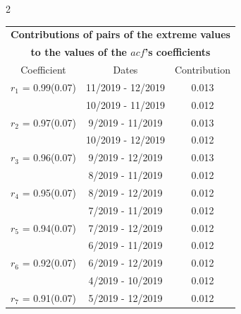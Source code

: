 
\thispagestyle{empty}
\begin{multicols}{2}{ 
\begin{tabular}{ccc}
\multicolumn{3}{c}{\textbf{Contributions of pairs of the extreme values} }  \vspace{-.10in}  \\ 
\multicolumn{3}{c}{ \textbf{to the values of the $acf$'s coefficients}} \\ 
\hline 
\hline                  Coefficient  &  Dates &  Contribution \\ 
\hline 
  $r_{ 1}$ = 0.99(0.07) &      11/2019 - 12/2019 &        0.013   \vspace{-.10in} \\  
&       10/2019 - 11/2019 &        0.012  \vspace{-.02in} \\ \hline 
  $r_{ 2}$ = 0.97(0.07) &       9/2019 - 11/2019 &        0.013   \vspace{-.10in} \\  
&       10/2019 - 12/2019 &        0.012  \vspace{-.02in} \\ \hline 
  $r_{ 3}$ = 0.96(0.07) &       9/2019 - 12/2019 &        0.013   \vspace{-.10in} \\  
&        8/2019 - 11/2019 &        0.012  \vspace{-.02in} \\ \hline 
  $r_{ 4}$ = 0.95(0.07) &       8/2019 - 12/2019 &        0.012   \vspace{-.10in} \\  
&        7/2019 - 11/2019 &        0.012  \vspace{-.02in} \\ \hline 
  $r_{ 5}$ = 0.94(0.07) &       7/2019 - 12/2019 &        0.012   \vspace{-.10in} \\  
&        6/2019 - 11/2019 &        0.012  \vspace{-.02in} \\ \hline 
  $r_{ 6}$ = 0.92(0.07) &       6/2019 - 12/2019 &        0.012   \vspace{-.10in} \\  
&        4/2019 - 10/2019 &        0.012  \vspace{-.02in} \\ \hline 
  $r_{ 7}$ = 0.91(0.07) &       5/2019 - 12/2019 &        0.012   \vspace{-.10in} \\  

\end{tabular}}
\end{multicols}
